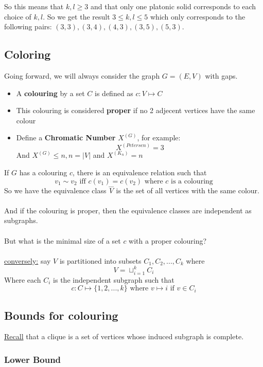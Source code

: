 \documentclass[12pt]{article}
\begin{document}
So this means that $k,l \geq 3$ and that only one platonic solid corresponds to each choice of $k,l$. So we get the result $3 \leq k, l \leq 5$ which only corresponds to the following pairs: $(3,3), (3,4), (4,3), (3,5), (5,3)$.

\subsection{Coloring}

Going forward, we will always consider the graph $G=(E,V)$ with gaps.
\begin{itemize}
	\item{A \textbf{colouring} by a set $C$ is defined as $c:V\mapsto C$}
	\item{This colouring is considered \textbf{proper} if no 2 adjecent vertices have the same colour}
	\item{Define a \textbf{Chromatic Number} $X^{(G)}$, for example: $$X^{(Petersen)}=3$$ And $X^{(G)} \leq n, n=|V|$ and $X^{(K_n)} = n$}
\end{itemize}

If $G$ has a colouring $c$, there is an equivalence relation such that $$v_1 \sim v_2 \text{ iff } c(v_1) = c(v_2) \text{ where } c \text{ is a colouring}$$ So we have the equivalence class $\overset{\_\_\_}{V}$ is the set of all vertices with the same colour.\\
\\
And if the colouring is proper, then the equivalence classes are independent as subgraphs.\\
\\
But what is the minimal size of a set $c$ with a proper colouring?\\
\\
\underline{conversely:} say $V$ is partitioned into subsets $C_1, C_2, ..., C_k$ where $$V=\sqcup^k_{i=1} C_i$$ Where each $C_i$ is the independent subgraph such that $$c:C \mapsto \{ 1,2,...,k \} \text{ where } v\mapsto i \text{ if } v \in C_i$$

\subsection{Bounds for colouring}

\underline{Recall} that a clique is a set of vertices whose induced subgraph is complete.

\subsubsection{Lower Bound}
\end{document}

